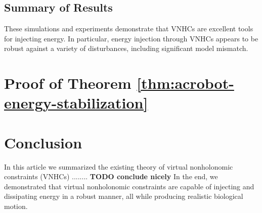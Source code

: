 \documentclass[journal,twoside,web]{ieeecolor}
\begin{document}
\subsection{Summary of Results} 
These simulations and experiments demonstrate that VNHCs are excellent
tools for injecting energy.
In particular, energy injection through VNHCs appears to be robust against a
variety of disturbances, including significant model mismatch.

\section{Proof of Theorem \ref{thm:acrobot-energy-stabilization}}\label{sec:proof}

\section{Conclusion}\label{sec:conclusion}
In this article we summarized the existing theory of virtual nonholonomic
constraints (VNHCs) ........
\textbf{TODO conclude nicely}
In the end, we demonstrated that virtual nonholonomic constraints are capable of
injecting and dissipating energy in a robust manner, all while producing
realistic biological motion.




\end{document}
